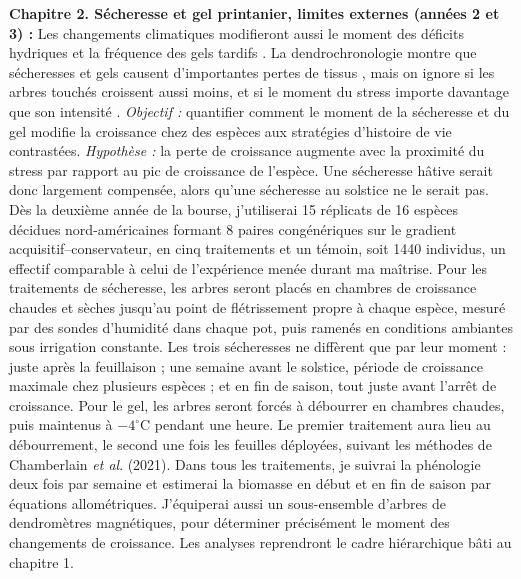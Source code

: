 \documentclass[12pt]{article}
\begin{document}
\textbf{Chapitre 2. Sécheresse et gel printanier, limites externes (années 2 et 3) :}
Les changements climatiques modifieront aussi le moment des déficits hydriques et la fréquence des gels tardifs \cite{dox_wood_2022}. La dendrochronologie montre que sécheresses et gels causent d'importantes pertes de tissus \cite{baumgarten_no_2023}, mais on ignore si les arbres touchés croissent aussi moins, et si le moment du stress importe davantage que son intensité \cite{chamberlain_late_2021}. \textit{Objectif :} quantifier comment le moment de la sécheresse et du gel modifie la croissance chez des espèces aux stratégies d'histoire de vie contrastées. \textit{Hypothèse :} la perte de croissance augmente avec la proximité du stress par rapport au pic de croissance de l'espèce. Une sécheresse hâtive serait donc largement compensée, alors qu'une sécheresse au solstice ne le serait pas.
Dès la deuxième année de la bourse, j'utiliserai 15 réplicats de 16 espèces décidues nord-américaines formant 8 paires congénériques sur le gradient acquisitif--conservateur, en cinq traitements et un témoin, soit 1440 individus, un effectif comparable à celui de l'expérience menée durant ma maîtrise. Pour les traitements de sécheresse, les arbres seront placés en chambres de croissance chaudes et sèches jusqu'au point de flétrissement propre à chaque espèce, mesuré par des sondes d'humidité dans chaque pot, puis ramenés en conditions ambiantes sous irrigation constante. Les trois sécheresses ne diffèrent que par leur moment : juste après la feuillaison ; une semaine avant le solstice, période de croissance maximale chez plusieurs espèces \cite{dorangeville_drought_2018} ; et en fin de saison, tout juste avant l'arrêt de croissance. Pour le gel, les arbres seront forcés à débourrer en chambres chaudes, puis maintenus à $-4^{\circ}$C pendant une heure. Le premier traitement aura lieu au débourrement, le second une fois les feuilles déployées, suivant les méthodes de Chamberlain \textit{et al}. (2021). Dans tous les traitements, je suivrai la phénologie deux fois par semaine et estimerai la biomasse en début et en fin de saison par équations allométriques. J'équiperai aussi un sous-ensemble d'arbres de dendromètres magnétiques, pour déterminer précisément le moment des changements de croissance. Les analyses reprendront le cadre hiérarchique bâti au chapitre 1. \\
\end{document}
